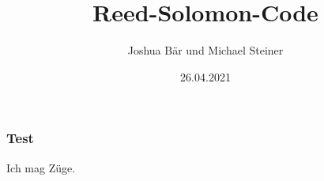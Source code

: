 \documentclass[11pt,aspectratio=169]{beamer}
\begin{document}
	\author{Joshua Bär und Michael Steiner}
	\title{Reed-Solomon-Code}
	\subtitle{}
	\logo{}
	\date{26.04.2021}
	\subject{Mathematisches Seminar}
	\begin{frame}[plain]
		\maketitle
	\end{frame}
	
	\begin{frame}
		\frametitle{Test}
		Ich mag Züge.
	\end{frame}
\end{document}
